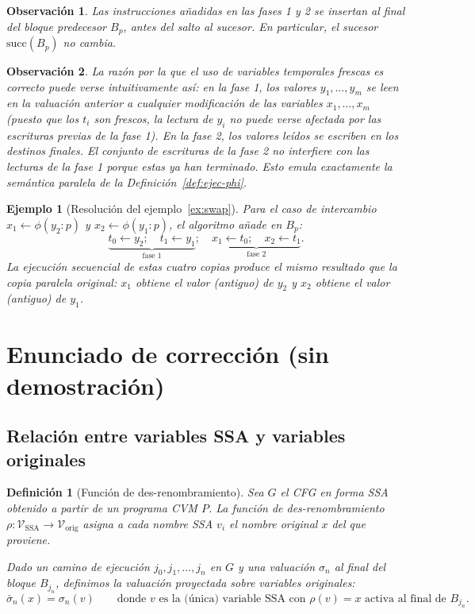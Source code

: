 \documentclass[12pt, a4paper]{article}
\newtheorem{definition}{Definición}[section]
\newtheorem{remark}{Observación}[section]
\newtheorem{example}{Ejemplo}[section]
\begin{document}
\begin{remark}
Las instrucciones añadidas en las fases 1 y 2 se insertan \emph{al final} del bloque predecesor
$B_p$, antes del salto al sucesor. En particular, el sucesor $\mathrm{succ}(B_p)$ no cambia.
\end{remark}

\begin{remark}
La razón por la que el uso de variables temporales frescas es correcto puede verse
intuitivamente así: en la fase 1, los valores $y_1, \ldots, y_m$ se leen en la valuación
anterior a cualquier modificación de las variables $x_1, \ldots, x_m$ (puesto que los $t_i$
son frescos, la lectura de $y_i$ no puede verse afectada por las escrituras previas de la fase
1). En la fase 2, los valores leídos se escriben en los destinos finales. El conjunto de
escrituras de la fase 2 no interfiere con las lecturas de la fase 1 porque estas ya han
terminado. Esto emula exactamente la semántica paralela de la Definición~\ref{def:ejec-phi}.
\end{remark}

\begin{example}[Resolución del ejemplo~\ref{ex:swap}]
Para el caso de intercambio $x_1 \leftarrow \phi(y_2:p)$ y $x_2 \leftarrow \phi(y_1:p)$, el
algoritmo añade en $B_p$:
\[
  \underbrace{t_0 \leftarrow y_2;\quad t_1 \leftarrow y_1}_{\text{fase 1}};\quad
  \underbrace{x_1 \leftarrow t_0;\quad x_2 \leftarrow t_1}_{\text{fase 2}}.
\]
La ejecución secuencial de estas cuatro copias produce el mismo resultado que la copia paralela
original: $x_1$ obtiene el valor (antiguo) de $y_2$ y $x_2$ obtiene el valor (antiguo) de
$y_1$.
\end{example}

\section{Enunciado de corrección (sin demostración)}

\subsection{Relación entre variables SSA y variables originales}

\begin{definition}[Función de des-renombramiento]
\label{def:rho}
Sea $G$ el CFG en forma SSA obtenido a partir de un programa CVM $P$. La \emph{función de
des-renombramiento} $\rho : \mathcal{V}_{\mathrm{SSA}} \to \mathcal{V}_{\mathrm{orig}}$ asigna
a cada nombre SSA $v_i$ el nombre original $x$ del que proviene.

Dado un camino de ejecución $j_0, j_1, \ldots, j_n$ en $G$ y una valuación $\sigma_n$ al
final del bloque $B_{j_n}$, definimos la \emph{valuación proyectada} sobre variables originales:
\[
  \bar\sigma_n(x) = \sigma_n(v)
  \qquad \text{donde } v \text{ es la (única) variable SSA con } \rho(v) = x
  \text{ activa al final de } B_{j_n}.
\]
\end{definition}
\end{document}
